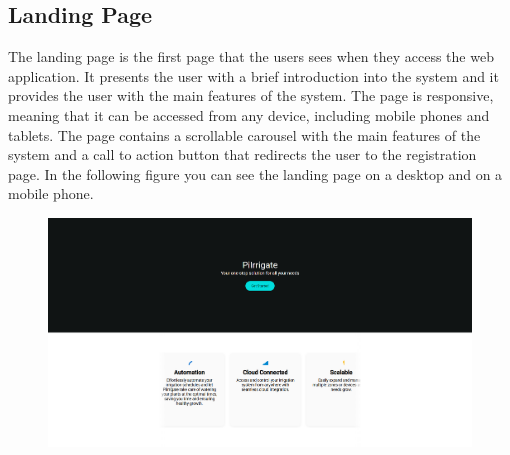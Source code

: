 \subsection{Landing Page}
The landing page is the first page that the users sees when they access the web application.
It presents the user with a brief introduction into the system and it provides the user with the main 
features of the system. The page is responsive, meaning that it can be accessed from any device,
including mobile phones and tablets. The page contains a scrollable
carousel with the main features of the system and a call to action button that redirects the user to the registration page.
In the following figure you can see the landing page on a desktop and on a mobile phone. 
\begin{figure}[H]
    \centering
    \begin{minipage}{0.5\textwidth}
        \centering
        \includegraphics[width=\textwidth]{images/landing_page.png}
        \label{fig:landing-page-desktop}
    \end{minipage}\hfill
    \begin{minipage}{0.3\textwidth}
        \centering

\end{minipage}
\end{figure}
